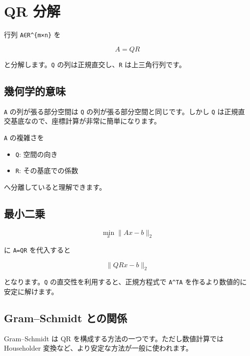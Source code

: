 \documentclass[
  11pt,
  a4paper,
]{ltjsarticle}
\author{}
\date{}
\providecommand{\tightlist}{%
  \setlength{\itemsep}{0pt}\setlength{\parskip}{0pt}}
\begin{document}
\hypertarget{qr-ux5206ux89e3}{%
\section{QR 分解}\label{qr-ux5206ux89e3}}

行列 \texttt{A∈R\^{}\{m×n\}} を

\[
A=QR
\]

と分解します。\texttt{Q} の列は正規直交し、\texttt{R} は上三角行列です。

\hypertarget{ux5e7eux4f55ux5b66ux7684ux610fux5473}{%
\subsection{幾何学的意味}\label{ux5e7eux4f55ux5b66ux7684ux610fux5473}}

\texttt{A} の列が張る部分空間は \texttt{Q}
の列が張る部分空間と同じです。しかし \texttt{Q}
は正規直交基底なので、座標計算が非常に簡単になります。

\texttt{A} の複雑さを

\begin{itemize}
\tightlist
\item
  \texttt{Q}: 空間の向き
\item
  \texttt{R}: その基底での係数
\end{itemize}

へ分離していると理解できます。

\hypertarget{ux6700ux5c0fux4e8cux4e57}{%
\subsection{最小二乗}\label{ux6700ux5c0fux4e8cux4e57}}

\[
\min_x\|Ax-b\|_2
\]

に \texttt{A=QR} を代入すると

\[
\|QRx-b\|_2
\]

となります。\texttt{Q} の直交性を利用すると、正規方程式で
\texttt{A\^{}TA} を作るより数値的に安定に解けます。

\hypertarget{gramschmidt-ux3068ux306eux95a2ux4fc2}{%
\subsection{Gram--Schmidt
との関係}\label{gramschmidt-ux3068ux306eux95a2ux4fc2}}

Gram--Schmidt は QR を構成する方法の一つです。ただし数値計算では
Householder 変換など、より安定な方法が一般に使われます。
\end{document}
